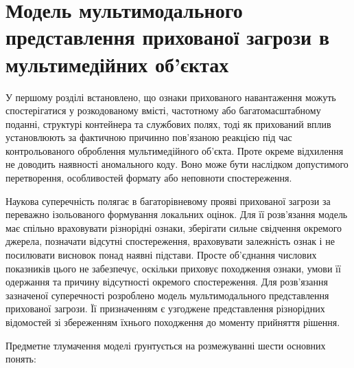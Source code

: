 \chapter{Модель мультимодального представлення прихованої загрози в мультимедійних об’єктах}
\label{chap:models_formalization}

У першому розділі встановлено, що ознаки прихованого навантаження можуть спостерігатися у розкодованому вмісті, частотному або багатомасштабному поданні, структурі контейнера та службових полях, тоді як прихований вплив установлюють за фактичною причинно пов’язаною реакцією під час контрольованого оброблення мультимедійного об’єкта. Проте окреме відхилення не доводить наявності аномального коду. Воно може бути наслідком допустимого перетворення, особливостей формату або неповноти спостереження.

Наукова суперечність полягає в багаторівневому прояві прихованої загрози за переважно ізольованого формування локальних оцінок. Для її розв’язання модель має спільно враховувати різнорідні ознаки, зберігати сильне свідчення окремого джерела, позначати відсутні спостереження, враховувати залежність ознак і не посилювати висновок понад наявні підстави. Просте об’єднання числових показників цього не забезпечує, оскільки приховує походження ознаки, умови її одержання та причину відсутності окремого спостереження. Для розв’язання зазначеної суперечності розроблено модель мультимодального представлення прихованої загрози. Її призначенням є узгоджене представлення різнорідних відомостей зі збереженням їхнього походження до моменту прийняття рішення.

Предметне тлумачення моделі ґрунтується на розмежуванні шести основних понять:

